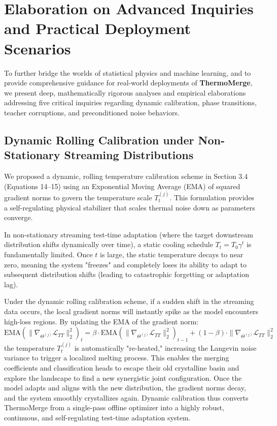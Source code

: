 \documentclass{article}
\theoremstyle{plain}
\theoremstyle{definition}
\theoremstyle{remark}
\begin{document}
\section{Elaboration on Advanced Inquiries and Practical Deployment Scenarios}
\label{sec:advanced_inquiries}

To further bridge the worlds of statistical physics and machine learning, and to provide comprehensive guidance for real-world deployments of \textbf{ThermoMerge}, we present deep, mathematically rigorous analyses and empirical elaborations addressing five critical inquiries regarding dynamic calibration, phase transitions, teacher corruptions, and preconditioned noise behaviors.

\subsection{Dynamic Rolling Calibration under Non-Stationary Streaming Distributions}
We proposed a dynamic, rolling temperature calibration scheme in Section 3.4 (Equations 14--15) using an Exponential Moving Average (EMA) of squared gradient norms to govern the temperature scale $T_t^{(j)}$. This formulation provides a self-regulating physical stabilizer that scales thermal noise down as parameters converge.

In non-stationary streaming test-time adaptation (where the target downstream distribution shifts dynamically over time), a static cooling schedule $T_t = T_0 \gamma^t$ is fundamentally limited. Once $t$ is large, the static temperature decays to near zero, meaning the system "freezes" and completely loses its ability to adapt to subsequent distribution shifts (leading to catastrophic forgetting or adaptation lag). 

Under the dynamic rolling calibration scheme, if a sudden shift in the streaming data occurs, the local gradient norms will instantly spike as the model encounters high-loss regions. By updating the EMA of the gradient norm:
\begin{equation}
    \text{EMA}\left(\|\nabla_{\Theta^{(j)}} \mathcal{L}_{TT}\|_2^2\right)_t = \beta \cdot \text{EMA}\left(\|\nabla_{\Theta^{(j)}} \mathcal{L}_{TT}\|_2^2\right)_{t-1} + (1 - \beta) \cdot \|\nabla_{\Theta^{(j)}} \mathcal{L}_{TT}\|_2^2
\end{equation}
the temperature $T_t^{(j)}$ is automatically "re-heated," increasing the Langevin noise variance to trigger a localized melting process. This enables the merging coefficients and classification heads to escape their old crystalline basin and explore the landscape to find a new synergistic joint configuration. Once the model adapts and aligns with the new distribution, the gradient norms decay, and the system smoothly crystallizes again. Dynamic calibration thus converts ThermoMerge from a single-pass offline optimizer into a highly robust, continuous, and self-regulating test-time adaptation system.
\end{document}
